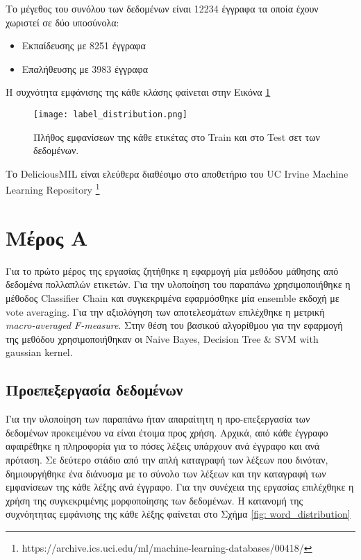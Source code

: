 Το μέγεθος του συνόλου των δεδομένων είναι 12234 έγγραφα τα οποία έχουν χωριστεί σε δύο υποσύνολα: 
	\begin{itemize}
		\item Εκπαίδευσης με 8251 έγγραφα
		\item Επαλήθευσης με 3983 έγγραφα
	\end{itemize}


Η συχνότητα εμφάνισης της κάθε κλάσης φαίνεται στην Εικόνα \ref{fig: label_distribution}

\begin{figure}
	\texttt{[image: label\_distribution.png]}
	\caption{Πλήθος εμφανίσεων της κάθε ετικέτας στο Train και στο Test σετ των δεδομένων.}
	\label{fig: label_distribution}
\end{figure}


Το DeliciousMIL είναι ελεύθερα διαθέσιμο στο αποθετήριο του UC Irvine Machine Learning Repository \footnote{https://archive.ics.uci.edu/ml/machine-learning-databases/00418/}


\section{Μέρος Α}
Για το πρώτο μέρος της εργασίας ζητήθηκε η εφαρμογή μία μεθόδου μάθησης από δεδομένα πολλαπλών ετικετών. Για την υλοποίηση του παραπάνω χρησιμοποιήθηκε η μέθοδος Classifier Chain και συγκεκριμένα εφαρμόσθηκε μία ensemble εκδοχή με vote averaging. Για την αξιολόγηση των αποτελεσμάτων επιλέχθηκε η μετρική \emph{macro-averaged F-measure}. Στην θέση του βασικού αλγορίθμου για την εφαρμογή της μεθόδου χρησιμοποιήθηκαν οι Naive Bayes, Decision Tree \& SVM with gaussian kernel. 

\subsection{Προεπεξεργασία δεδομένων}
Για την υλοποίηση των παραπάνω ήταν απαραίτητη η προ-επεξεργασία των δεδομένων προκειμένου να είναι έτοιμα προς χρήση. Αρχικά, από κάθε έγγραφο αφαιρέθηκε η πληροφορία για το πόσες λέξεις υπάρχουν ανά έγγραφο και ανά πρόταση. Σε δεύτερο στάδιο από την απλή καταγραφή των λέξεων που δινόταν, δημιουργήθηκε ένα διάνυσμα με το σύνολο των λέξεων και την καταγραφή των εμφανίσεων της κάθε λέξης ανά έγγραφο. Για την συνέχεια της εργασίας επιλέχθηκε η χρήση της συγκεκριμένης μορφοποίησης των δεδομένων. Η κατανομή της συχνόητητας εμφάνισης της κάθε λέξης φαίνεται στο Σχήμα \ref{fig: word_distribution}

